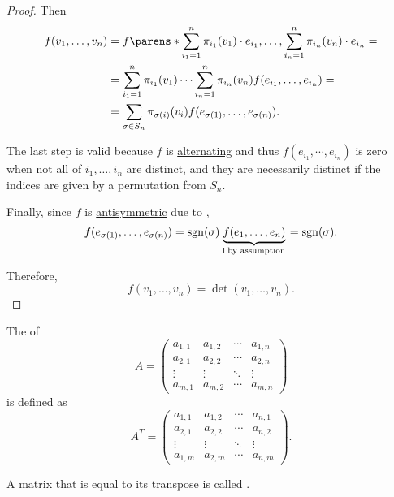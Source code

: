 \begin{proof}
  Then
  \begin{align*}
    f(v_1, \ldots, v_n)
    &=
    f\parens*{ \sum_{i_1=1}^n \pi_{i_1}(v_1) \cdot e_{i_1}, \ldots, \sum_{i_n=1}^n \pi_{i_n}(v_n) \cdot e_{i_n} }
    = \\ &=
    \sum_{i_1=1}^n \pi_{i_1}(v_1) \cdots \sum_{i_n=1}^n \pi_{i_n}(v_n) f(e_{i_1}, \ldots, e_{i_n})
    = \\ &=
    \sum_{\sigma \in S_n} \pi_{\sigma(i)}(v_i) f(e_{\sigma(1)}, \ldots, e_{\sigma(n)}).
  \end{align*}

  The last step is valid because \( f \) is \hyperref[def:alternating_function]{alternating} and thus \( f(e_{i_1}, \cdots, e_{i_n}) \) is zero when not all of \( i_1, \ldots, i_n \) are distinct, and they are necessarily distinct if the indices are given by a permutation from \( S_n \).

  Finally, since \( f \) is \hyperref[def:antisymmetric_function]{antisymmetric} due to ,
  \begin{equation*}
    f(e_{\sigma(1)}, \ldots, e_{\sigma(n)}) = \sgn(\sigma) \underbrace{f(e_1, \ldots, e_n)}_{1 \T*{by assumption}} = \sgn(\sigma).
  \end{equation*}

  Therefore,
  \begin{equation*}
    f(v_1, \ldots, v_n) = \det(v_1, \ldots, v_n).
  \end{equation*}
\end{proof}

\begin{definition}\label{def:transpose_matrix}\mimprovised
  The  of
  \begin{equation*}
    A = \begin{pmatrix}
      a_{1,1} & a_{1,2} & \cdots & a_{1,n} \\
      a_{2,1} & a_{2,2} & \cdots & a_{2,n} \\
      \vdots  & \vdots  & \ddots & \vdots  \\
      a_{m,1} & a_{m,2} & \cdots & a_{m,n}
    \end{pmatrix}
  \end{equation*}
  is defined as
  \begin{equation*}
    A^T = \begin{pmatrix}
      a_{1,1} & a_{1,2} & \cdots & a_{n,1} \\
      a_{2,1} & a_{2,2} & \cdots & a_{n,2} \\
      \vdots  & \vdots  & \ddots & \vdots  \\
      a_{1,m} & a_{2,m} & \cdots & a_{n,m}
    \end{pmatrix}.
  \end{equation*}

  A matrix that is equal to its transpose is called .
\end{definition}

